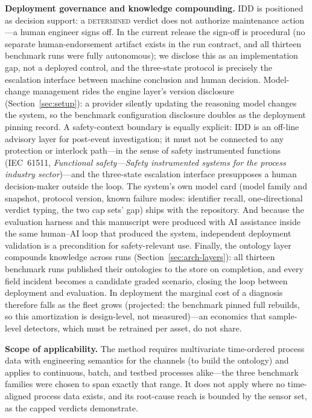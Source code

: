 \documentclass[preprint,10pt]{elsarticle}
\begin{document}
\textbf{Deployment governance and knowledge compounding.} IDD is positioned as decision support: a \mbox{\textsc{determined}} verdict does not authorize maintenance action---a human engineer signs off. In the current release the sign-off is procedural (no separate human-endorsement artifact exists in the run contract, and all thirteen benchmark runs were fully autonomous); we disclose this as an implementation gap, not a deployed control, and the three-state protocol is precisely the escalation interface between machine conclusion and human decision. Model-change management rides the engine layer's version disclosure (Section~\ref{sec:setup}): a provider silently updating the reasoning model changes the system, so the benchmark configuration disclosure doubles as the deployment pinning record. A safety-context boundary is equally explicit: IDD is an off-line advisory layer for post-event investigation; it must not be connected to any protection or interlock path---in the sense of safety instrumented functions (IEC~61511, \emph{Functional safety---Safety instrumented systems for the process industry sector})---and the three-state escalation interface presupposes a human decision-maker outside the loop. The system's own model card (model family and snapshot, protocol version, known failure modes: identifier recall, one-directional verdict typing, the two cap sets' gap) ships with the repository. And because the evaluation harness and this manuscript were produced with AI assistance inside the same human--AI loop that produced the system, independent deployment validation is a precondition for safety-relevant use. Finally, the ontology layer compounds knowledge across runs (Section~\ref{sec:arch-layers}): all thirteen benchmark runs published their ontologies to the store on completion, and every field incident becomes a candidate graded scenario, closing the loop between deployment and evaluation. In deployment the marginal cost of a diagnosis therefore falls as the fleet grows (projected: the benchmark pinned full rebuilds, so this amortization is design-level, not measured)---an economics that sample-level detectors, which must be retrained per asset, do not share.

\textbf{Scope of applicability.} The method requires multivariate time-ordered process data with engineering semantics for the channels (to build the ontology) and applies to continuous, batch, and testbed processes alike---the three benchmark families were chosen to span exactly that range. It does not apply where no time-aligned process data exists, and its root-cause reach is bounded by the sensor set, as the capped verdicts demonstrate.
\end{document}
